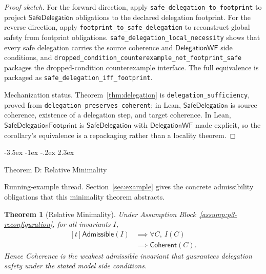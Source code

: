 \documentclass[a4paper,10pt,twocolumn,english]{article}
\makeatletter
\renewcommand{\section}{\@startsection{section}{1}{\z@}%
  {-3.5ex \@plus -1ex \@minus -.2ex}%
  {2.3ex}%
  {\raggedright\normalfont\large\bfseries}}
\numberwithin{equation}{section}
\theoremstyle{paperdef}
\theoremstyle{paperplain}
\newtheorem{theorem}[definition]{Theorem}
\theoremstyle{paperdef}
\theoremstyle{paperremark}
\theoremstyle{paperdef}
\newcommand{\Coherent}{\ensuremath{\mathsf{Coherent}}}
\newcommand{\Admissible}{\ensuremath{\mathsf{Admissible}}}
\makeatother
\begin{document}
\begin{proof}[Proof sketch]
	For the forward direction, apply \nolinkurl{safe_delegation_to_footprint} to project $\mathsf{SafeDelegation}$ obligations to the declared delegation footprint. For the reverse direction, apply \nolinkurl{footprint_to_safe_delegation} to reconstruct global safety from footprint obligations. \nolinkurl{safe_delegation_local_necessity} shows that every safe delegation carries the source coherence and $\mathsf{DelegationWF}$ side conditions, and \nolinkurl{dropped_condition_counterexample_not_footprint_safe} packages the dropped-condition counterexample interface. The full equivalence is packaged as \nolinkurl{safe_delegation_iff_footprint}.

	Mechanization status. Theorem~\ref{thm:delegation} is \nolinkurl{delegation_sufficiency}, proved from \nolinkurl{delegation_preserves_coherent}; in Lean, $\mathsf{SafeDelegation}$ is source coherence, existence of a delegation step, and target coherence. In Lean, $\mathsf{SafeDelegationFootprint}$ is $\mathsf{SafeDelegation}$ with $\mathsf{DelegationWF}$ made explicit, so the corollary's equivalence is a repackaging rather than a locality theorem.
\end{proof}

\section{Theorem D: Relative Minimality}
\label{sec:theorem-d}

Running-example thread. Section~\ref{sec:example} gives the concrete
admissibility obligations that this minimality theorem abstracts.

\begin{theorem}[Relative Minimality]
	\label{thm:minimality}
	Under Assumption Block~\ref{assump:p3-reconfiguration}, for all invariants $I$,
	\begin{equation}
		\begin{aligned}[t]
			\Admissible(I)
			 & \implies \forall C,\ I(C) \\
			 & \implies \Coherent(C).
		\end{aligned}
	\end{equation}
	Hence Coherence is the weakest admissible invariant that guarantees delegation safety under the stated model side conditions.
\end{theorem}
\end{document}
